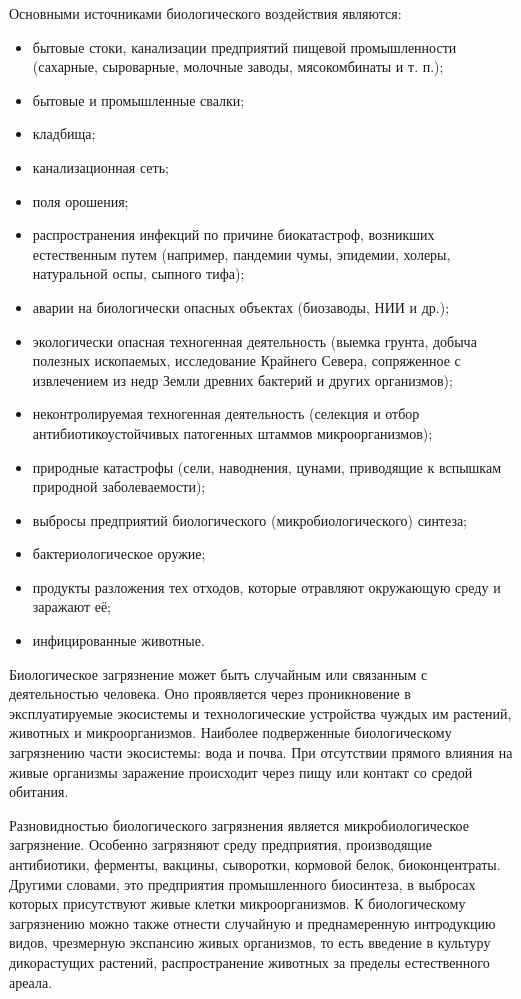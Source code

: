 \documentclass[a4paper, 12pt]{extarticle}
\begin{document}
Основными источниками биологического воздействия являются:
\begin{itemize}
    \item бытовые стоки, канализации предприятий пищевой промышленности (сахарные, сыроварные, молочные заводы, мясокомбинаты и т. п.);
    \item бытовые и промышленные свалки;
    \item кладбища;
    \item канализационная сеть;
    \item поля орошения;
    \item распространения инфекций по причине биокатастроф, возникших естественным путем (например, пандемии чумы, эпидемии, холеры, натуральной оспы, сыпного тифа);
    \item аварии на биологически опасных объектах (биозаводы, НИИ и др.);
    \item экологически опасная техногенная деятельность (выемка грунта, добыча полезных ископаемых, исследование Крайнего Севера, сопряженное с извлечением из недр Земли древних бактерий и других организмов);
    \item неконтролируемая техногенная деятельность (селекция и отбор антибиотикоустойчивых патогенных штаммов микроорганизмов);
    \item природные катастрофы (сели, наводнения, цунами, приводящие к вспышкам природной заболеваемости);
    \item выбросы предприятий биологического (микробиологического) синтеза;
    \item бактериологическое оружие;
    \item продукты разложения тех отходов, которые отравляют окружающую среду и заражают её;
    \item инфицированные животные.
\end{itemize}

Биологическое загрязнение может быть случайным или связанным с деятельностью человека. Оно проявляется через проникновение в эксплуатируемые экосистемы и технологические устройства чуждых им растений, животных и микроорганизмов. Наиболее подверженные биологическому загрязнению части экосистемы: вода и почва. При отсутствии прямого влияния на живые организмы заражение происходит через пищу или контакт со средой обитания.

Разновидностью биологического загрязнения является микробиологическое загрязнение. Особенно загрязняют среду предприятия, производящие антибиотики, ферменты, вакцины, сыворотки, кормовой белок, биоконцентраты. Другими словами, это предприятия промышленного биосинтеза, в выбросах которых присутствуют живые клетки микроорганизмов. К биологическому загрязнению можно также отнести случайную и преднамеренную  интродукцию видов, чрезмерную экспансию живых организмов, то есть введение в культуру дикорастущих растений, распространение животных за пределы естественного ареала.
\end{document}
